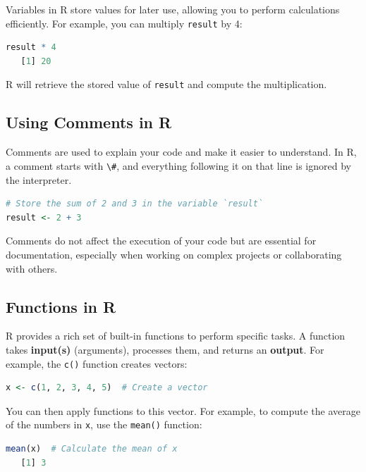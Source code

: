 \documentclass[
]{book}
\newcommand{\passthrough}[1]{#1}
\theoremstyle{definition}
\theoremstyle{definition}
\theoremstyle{definition}
\theoremstyle{definition}
\theoremstyle{remark}
\begin{document}
Variables in R store values for later use, allowing you to perform calculations efficiently. For example, you can multiply \passthrough{\lstinline!result!} by 4:

\begin{lstlisting}[language=R]
result * 4
   [1] 20
\end{lstlisting}

R will retrieve the stored value of \passthrough{\lstinline!result!} and compute the multiplication.

\subsection*{Using Comments in R}\label{using-comments-in-r}

Comments are used to explain your code and make it easier to understand. In R, a comment starts with \passthrough{\lstinline!\#!}, and everything following it on that line is ignored by the interpreter.

\begin{lstlisting}[language=R]
# Store the sum of 2 and 3 in the variable `result`
result <- 2 + 3
\end{lstlisting}

Comments do not affect the execution of your code but are essential for documentation, especially when working on complex projects or collaborating with others.

\subsection{Functions in R}\label{functions-in-r}

R provides a rich set of built-in functions to perform specific tasks. A function takes \textbf{input(s)} (arguments), processes them, and returns an \textbf{output}. For example, the \passthrough{\lstinline!c()!} function creates vectors:

\begin{lstlisting}[language=R]
x <- c(1, 2, 3, 4, 5)  # Create a vector
\end{lstlisting}

You can then apply functions to this vector. For example, to compute the average of the numbers in \passthrough{\lstinline!x!}, use the \passthrough{\lstinline!mean()!} function:

\begin{lstlisting}[language=R]
mean(x)  # Calculate the mean of x
   [1] 3
\end{lstlisting}
\end{document}

